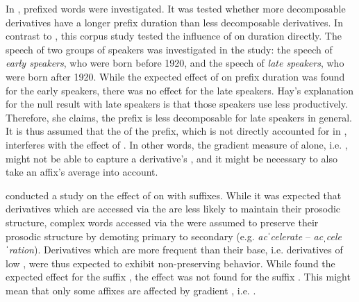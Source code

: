 In \citet{Hay.2007},  prefixed words were investigated. It was tested whether more decomposable derivatives have a longer prefix duration than less decom\-posable  derivatives.  In contrast to \cite{Hay.2003}, this corpus study tested the influence of  on duration directly. The speech of two groups of speakers was investigated in the study: the speech of \textit{early speakers}, who were born before 1920, and the speech of \textit{late speakers}, who were born after 1920. 
While the expected effect of  on prefix duration was found for the early speakers, there was no effect  for the late speakers. Hay's explanation for the null result with late speakers is that those speakers use  less productively. Therefore, she claims, the prefix is less decomposable for late speakers in general. It is thus assumed that the  of the prefix, which is not directly accounted for in , interferes with the effect of . In other words, the gradient measure of  alone, i.e. , might not be able to capture a derivative's , and it might be necessary to also take an affix's average  into account.
 
 \cite{Collie.2008} conducted a study on the effect of  on  with suffixes. While it was expected that derivatives which are accessed via the  are less likely to maintain their prosodic structure, complex words accessed via the  were assumed to preserve their prosodic structure by demoting primary  to secondary  (e.g. \textit{acˈcelerate} --  \textit{acˌceleˈration}). Derivatives which are more frequent than their base, i.e. derivatives of low , were thus expected to exhibit non-preserving behavior. While \cite{Collie.2008} found the expected effect for the suffix , the effect was not found for the suffix . This might mean that only some affixes are affected by gradient , i.e. .
 	
